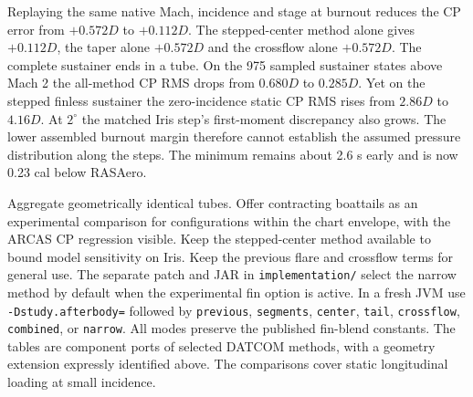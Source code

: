  Replaying the same native Mach, incidence and stage at burnout reduces the CP error from $+0.572D$ to $+0.112D$. The stepped-center method alone gives $+0.112D$, the taper alone $+0.572D$ and the crossflow alone $+0.572D$. The complete sustainer ends in a tube. On the 975 sampled sustainer states above Mach 2 the all-method CP RMS drops from $0.680D$ to $0.285D$. Yet on the stepped finless sustainer the zero-incidence static CP RMS rises from $2.86D$ to $4.16D$. At $2^\circ$ the matched Iris step's first-moment discrepancy also grows. The lower assembled burnout margin therefore cannot establish the assumed pressure distribution along the steps. The minimum remains about 2.6 s early and is now 0.23 cal below RASAero.

 Aggregate geometrically identical tubes. Offer contracting boattails as an experimental comparison for configurations within the chart envelope, with the ARCAS CP regression visible. Keep the stepped-center method available to bound model sensitivity on Iris. Keep the previous flare and crossflow terms for general use. The separate patch and JAR in \texttt{implementation/} select the narrow method by default when the experimental fin option is active. In a fresh JVM use \texttt{-Dstudy.afterbody=} followed by \texttt{previous}, \texttt{segments}, \texttt{center}, \texttt{tail}, \texttt{crossflow}, \texttt{combined}, or \texttt{narrow}. All modes preserve the published fin-blend constants. The tables are component ports of selected DATCOM methods, with a geometry extension expressly identified above. The comparisons cover static longitudinal loading at small incidence.
